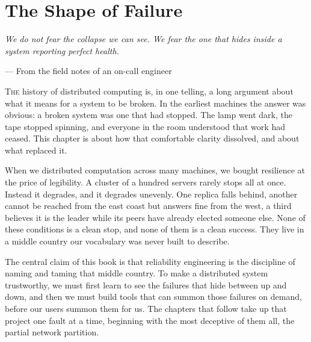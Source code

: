 \documentclass[11pt, oneside]{book}
\newcommand{\epigraph}[2]{%
  \begin{flushright}\begin{minipage}{0.72\textwidth}\raggedleft
    \itshape #1\par\vspace{0.3em}\upshape\small\color{accent}--- #2
  \end{minipage}\end{flushright}\vspace{1.8em}}
\begin{document}
\chapter{The Shape of Failure}

\epigraph{We do not fear the collapse we can see. We fear the one that hides
inside a system reporting perfect health.}{From the field notes of an on-call engineer}

\lettrine[lines=3, lhang=0.1, findent=0.1em, nindent=0.4em]{\color{accent}T}{he}
history of distributed computing is, in one telling, a long argument about what
it means for a system to be broken. In the earliest machines the answer was
obvious: a broken system was one that had stopped. The lamp went dark, the tape
stopped spinning, and everyone in the room understood that work had ceased. This
chapter is about how that comfortable clarity dissolved, and about what replaced
it.

When we distributed computation across many machines, we bought resilience at
the price of legibility. A cluster of a hundred servers rarely stops all at
once. Instead it degrades, and it degrades unevenly. One replica falls behind,
another cannot be reached from the east coast but answers fine from the west, a
third believes it is the leader while its peers have already elected someone
else. None of these conditions is a clean stop, and none of them is a clean
success. They live in a middle country our vocabulary was never built to
describe.

The central claim of this book is that reliability engineering is the discipline
of naming and taming that middle country. To make a distributed system
trustworthy, we must first learn to see the failures that hide between up and
down, and then we must build tools that can summon those failures on demand,
before our users summon them for us. The chapters that follow take up that
project one fault at a time, beginning with the most deceptive of them all, the
partial network partition.
\end{document}
